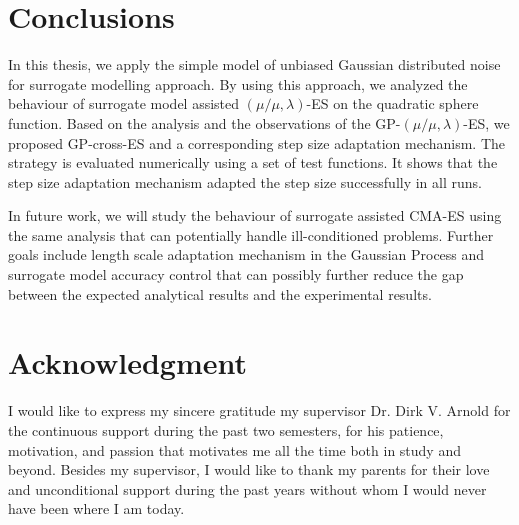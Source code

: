 







\section{Conclusions}
In this thesis, we apply the simple model \cite{DBLP:conf/ppsn/KayhaniA18} of unbiased Gaussian distributed noise for surrogate modelling  approach. By using this approach, we analyzed the behaviour of surrogate model assisted $(\mu/\mu,\lambda)$-ES on the quadratic sphere function. Based on the analysis and the observations of the GP-$(\mu/\mu,\lambda)$-ES, we proposed GP-cross-ES and a corresponding step size adaptation mechanism. The strategy is evaluated numerically using a set of test functions. It shows that the step size adaptation mechanism adapted the step size successfully in all runs.

In future work, we will study the behaviour of surrogate assisted CMA-ES using the same analysis that can potentially handle ill-conditioned problems. Further goals include length scale adaptation mechanism in the Gaussian Process and surrogate model accuracy control that can possibly further reduce the gap between the expected analytical results and the experimental results. 

\section*{Acknowledgment}
I would like to express my sincere gratitude my supervisor Dr. Dirk V. Arnold for the continuous support during the past two semesters, for his patience, motivation, and passion that motivates me all the time both in study and beyond. Besides my supervisor, I would like to thank my parents for their love and unconditional support during the past years without whom I would never have been where I am today.



